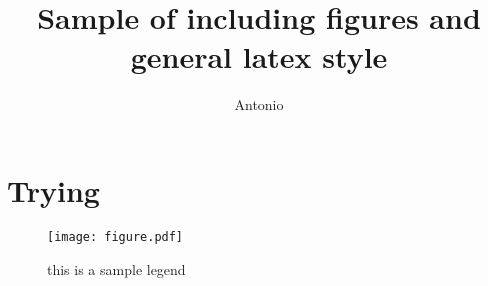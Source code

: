 \documentclass[a4paper,10pt]{article}
\title{Sample of including figures and general latex style}
\author{Antonio}
\begin{document}
\maketitle


\section{Trying}

\blindtext[7]

\begin{figure}
\texttt{[image: figure.pdf]}
\caption{this is a sample legend}
\end{figure}
\end{document}
